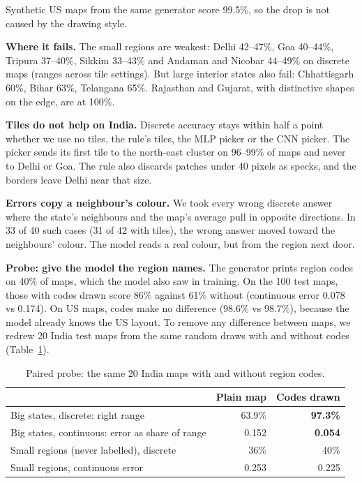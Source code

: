 \documentclass[11pt,a4paper]{article}
\begin{document}
Synthetic US maps from the same generator score 99.5\%, so the drop is not caused by the drawing style.

\textbf{Where it fails.} The small regions are weakest: Delhi 42--47\%, Goa 40--44\%, Tripura 37--40\%, Sikkim 33--43\% and Andaman and Nicobar 44--49\% on discrete maps (ranges across tile settings). But large interior states also fail: Chhattisgarh 60\%, Bihar 63\%, Telangana 65\%. Rajasthan and Gujarat, with distinctive shapes on the edge, are at 100\%.

\textbf{Tiles do not help on India.} Discrete accuracy stays within half a point whether we use no tiles, the rule's tiles, the MLP picker or the CNN picker. The picker sends its first tile to the north-east cluster on 96--99\% of maps and never to Delhi or Goa. The rule also discards patches under 40 pixels as specks, and the borders leave Delhi near that size.

\textbf{Errors copy a neighbour's colour.} We took every wrong discrete answer where the state's neighbours and the map's average pull in opposite directions. In 33 of 40 such cases (31 of 42 with tiles), the wrong answer moved toward the neighbours' colour. The model reads a real colour, but from the region next door.

\textbf{Probe: give the model the region names.} The generator prints region codes on 40\% of maps, which the model also saw in training. On the 100 test maps, those with codes drawn score 86\% against 61\% without (continuous error 0.078 vs 0.174). On US maps, codes make no difference (98.6\% vs 98.7\%), because the model already knows the US layout. To remove any difference between maps, we redrew 20 India test maps from the same random draws with and without codes (Table~\ref{tab:labels}).

\begin{table}[h]
\centering\small
\caption{Paired probe: the same 20 India maps with and without region codes.}
\label{tab:labels}
\begin{tabular}{@{}lrr@{}}
\toprule
 & Plain map & Codes drawn\\
\midrule
Big states, discrete: right range & 63.9\% & \textbf{97.3\%}\\
Big states, continuous: error as share of range & 0.152 & \textbf{0.054}\\
Small regions (never labelled), discrete & 36\% & 40\%\\
Small regions, continuous error & 0.253 & 0.225\\
\bottomrule
\end{tabular}
\end{table}
\end{document}
